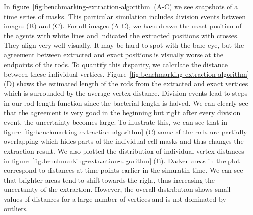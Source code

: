 \documentclass{article}
\begin{document}
In figure~\ref{fig:benchmarking-extraction-algorithm} (A-C) we see snapshots of a time series of
masks.
This particular simulation includes division events between images (B) and (C).
For all images (A-C), we have drawn the exact position of the agents with white lines and indicated
the extracted positions with crosses.
They align very well visually.
It may be hard to spot with the bare eye, but the agreement between extracted and exact positions is
visually worse at the endpoints of the rods.
To quantify this disparity, we calculate the distance between these individual vertices.
Figure~\ref{fig:benchmarking-extraction-algorithm} (D) shows the estimated length of the rods from
the extracted and exact vertices which is surrounded by the average vertex distance.
Division events lead to steps in our rod-length function since the bacterial length is halved.
We can clearly see that the agreement is very good in the beginning but right after every division
event, the uncertainty becomes large.
To illustrate this, we can see that in figure~\ref{fig:benchmarking-extraction-algorithm} (C) some
of the rods are partially overlapping which hides parts of the individual cell-masks and thus
changes the extraction result.
We also plotted the distribution of individual vertex distances in
figure~\ref{fig:benchmarking-extraction-algorithm} (E).
Darker areas in the plot correspond to distances at time-points earlier in the simulatin time.
We can see that brighter areas tend to shift towards the right, thus increasing the uncertainty of
the extraction.
However, the overall distribution shows small values of distances for a large number of vertices and
is not dominated by outliers.
\end{document}
